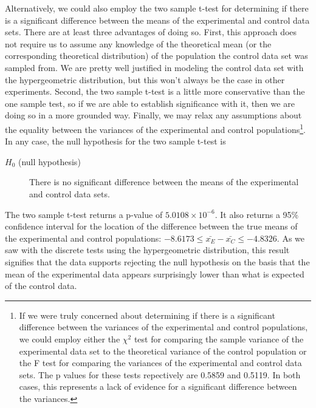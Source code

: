 \documentclass{amsart}
\begin{document}
Alternatively, we could also employ the two sample t-test for determining if there is a significant difference between the means of the experimental and control data sets. There are at least three advantages of doing so. First, this approach does not require us to assume any knowledge of the theoretical mean (or the corresponding theoretical distribution) of the population the control data set was sampled from. We are pretty well justified in modeling the control data set with the hypergeometric distribution, but this won't always be the case in other experiments. Second, the two sample t-test is a little more conservative than the one sample test, so if we are able to establish significance with it, then we are doing so in a more grounded way. Finally, we may relax any assumptions about the equality between the variances of the  experimental and control populations\footnote{If we were truly concerned about determining if there is a significant difference between the variances of the experimental and control populations, we could employ either the $\chi^2$ test for comparing the sample variance of the experimental data set to the theoretical variance of the control population or the F test for comparing the variances of the experimental and control data sets. The p values for these tests repectively are 0.5859 and 0.5119. In both cases, this represents a lack of evidence for a significant difference between the variances.}. In any case, the null hypothesis for the two sample t-test is
\begin{description}
\item[$H_0$ (null hypothesis)] There is no significant difference between the means of the experimental and control data sets.
\end{description}
The two sample t-test returns a p-value of $5.0108\times 10^{-6}$. It also returns a 95\% confidence interval for the location of the difference between the true means of the experimental and control populations: $-8.6173\le \bar{x_E}-\bar{x_C} \le -4.8326$.
As we saw with the discrete tests using the hypergeometric distribution, this result signifies that the data supports rejecting the null hypothesis on the basis that the mean of the experimental data appears surprisingly lower than what is expected of the control data. 
\end{document}
